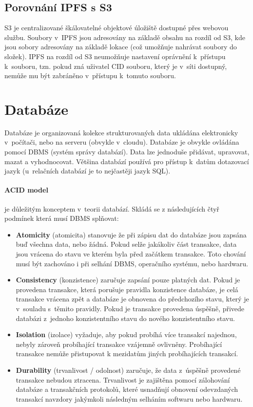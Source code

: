 \documentclass[12pt, a4paper,
  oneside,      %
]{report}
\begin{document}
\subsection{Porovnání IPFS s S3}
S3 je centralizované škálovatelné objektové úložiště dostupné přes webovou službu. Soubory v~IPFS jsou adresovány na základě obsahu na rozdíl od S3, kde jsou sobory adresovány na základě lokace (což umožňuje nahrávat soubory do složek). IPFS na rozdíl od S3 neumožňuje nastavení oprávnění k~přístupu k~souboru, tzn. pokud zná uživatel CID souboru, který je v~síti dostupný, nemůže mu být zabráněno v~přístupu k~tomuto souboru. \cite{whatIsS3}

\section{Databáze}
Databáze je organizovaná kolekce strukturovaných data ukládána elektronicky v~počítači, nebo na serveru (obvykle v~cloudu). Databáze je obvykle ovládána pomocí DBMS (systém správy databází). Data lze jednoduše přidávat, upravovat, mazat a vyhodnocovat. Většina databází používá pro přístup k~datům dotazovací jazyk (u~relačních databází je to nejčastěji jazyk SQL). \cite{whatIsDatabase}
\paragraph{ACID model} je důležitým konceptem v~teorii databází. Skládá se z následujících čtyř podmínek která musí DBMS splňovat:
\begin{itemize}


	\item \textbf{Atomicity} (atomicita) stanovuje že při zápisu dat do databáze jsou zapsána buď všechna data, nebo žádná. Pokud selže jakákoliv část transakce, data jsou vrácena do stavu ve kterém byla před začátkem transakce. Toto chování musí být zachováno i při selhání DBMS, operačního systému, nebo hardwaru. \cite{whatIsACID}
	\item \textbf{Consistency} (konzistence) zaručuje zapsání pouze platných dat. Pokud je provedena transakce, která porušuje pravidla konzistence databáze, je celá transakce vrácena zpět a databáze je obnovena do předchozího stavu, který je v~souladu s~těmito pravidly. Pokud je transakce provedena úspěšně, přivede databázi z~jednoho konzistentního stavu do nového konzistentního stavu. \cite{whatIsACID}
	\item \textbf{Isolation} (izolace) vyžaduje, aby pokud probíhá více transakcí najednou, nebyly zároveň probíhající transakce vzájemně ovlivněny. Probíhající transakce nemůže přistupovat k mezidatům jiných probíhajících transakcí. \cite{whatIsACID}
	\item \textbf{Durability} (trvanlivost / odolnost) zaručuje, že data z~úspěšně provedené transakce nebudou ztracena. Trvanlivost je zajištěna pomocí zálohování databáze a transakčních protokolů, které usnadňují obnovení odevzdaných transakcí navzdory jakýmkoli následným selháním softwaru nebo hardwaru. \cite{whatIsACID}
\end{itemize}
\end{document}
